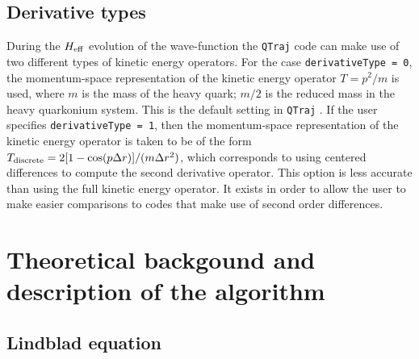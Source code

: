 \documentclass[times,sort&compress,final]{elsarticle}
\def\qtraj{{\tt QTraj} }
\begin{document}
\subsection{Derivative types}
\label{sec:derivativetypes}

During the $H_{\rm eff}$ evolution of the wave-function the \qtraj code can make use of two different types of kinetic energy operators.  For the case {\tt derivativeType = 0}, the momentum-space representation of the kinetic energy operator $T = p^2/m$ is used, where $m$ is the mass of the heavy quark; $m/2$ is the reduced mass in the heavy quarkonium system.  This is the default setting in \qtraj.  If the user specifies {\tt derivativeType = 1}, then the momentum-space representation of the kinetic energy operator is taken to be of the form $T_{\rm discrete} = 2 [1-\cos(p\Delta r)]/(m\Delta r^2)$, which corresponds to using centered differences to compute the second derivative operator.  This option is less accurate than using the full kinetic energy operator.  It exists in order to allow the user to make easier comparisons to codes that make use of second order differences.  

\section{Theoretical backgound and description of the algorithm}
\label{sec:algorithm}

\subsection{Lindblad equation}
\label{sec:Lindblad}
\end{document}
